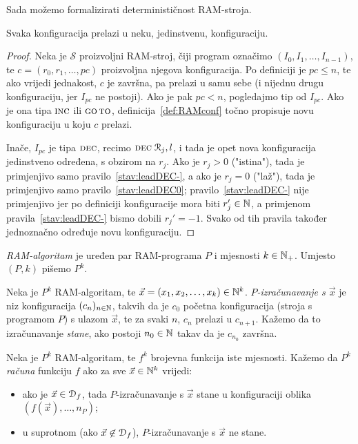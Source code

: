 Sada možemo formalizirati determinističnost RAM-stroja.

\begin{lema}[{name=[determinističnost RAM-stroja]}]\label{lema:ramdet}
Svaka konfiguracija prelazi u neku, jedinstvenu, konfiguraciju.
\end{lema}
\begin{proof}
Neka je $\mathcal S$ proizvoljni RAM-stroj, čiji program označimo  $(I_0, I_1,\dotsc, I_{n-1})$, te $c=(r_0,r_1,\dotsc,pc)$ proizvoljna njegova konfiguracija. Po definiciji je $pc\le n$, te ako vrijedi jednakost, $c$ je završna, pa prelazi u samu sebe (i nijednu drugu konfiguraciju, jer $I_{pc}$ ne postoji). Ako je pak $pc<n$, pogledajmo tip od $I_{pc}$. Ako je ona tipa $\textsc{inc}$ ili $\textsc{go\,to}$, definicija~\ref{def:RAMconf} točno propisuje novu konfiguraciju u koju $c$ prelazi.

    Inače, $I_{pc}$ je tipa $\textsc{dec}$, recimo $\textsc{dec}\;\mathcal R_{j},l$, i tada je opet nova konfiguracija jedinstveno određena, s obzirom na $r_j$. Ako je $r_j>0$ ("istina"), tada je primjenjivo samo pravilo~\ref{stav:leadDEC-}, a ako je $r_j=0$ ("laž"), tada je primjenjivo samo pravilo~\ref{stav:leadDEC0}; pravilo~\ref{stav:leadDEC-} nije primjenjivo jer po definiciji konfiguracije mora biti $r_j'\in{\mathbb N}$, a primjenom pravila~\ref{stav:leadDEC-} bismo dobili $r_j'=-1$. Svako od tih pravila također jednoznačno određuje novu konfiguraciju.
\end{proof}

\begin{definicija}[{name=[{RAM-algoritam, izračunavanje i računanje funkcije}]}]
\label{def:compute}
\emph{RAM-algoritam} je uređen par RAM-programa $P$ i mjesnosti $k\in{\mathbb N}_+$. Umjesto $(P,k)$ pišemo $P^k$.

Neka je $P^k$ RAM-algoritam, te $\vec x=(x_1,x_2,\dotsc,x_k)\in{\mathbb N}^k$. \emph{$P$\!-izračunavanje s $\vec x$} je niz konfiguracija $(c_n)_{n\in{\mathbb N}}$, takvih da je $c_0$ početna konfiguracija (stroja s programom $P$) s ulazom $\vec x$, te za svaki $n$, $c_n$ prelazi u $c_{n+1}$. Kažemo da to izračunavanje \emph{stane}, ako postoji $n_0\in{\mathbb N}$ takav da je $c_{n_0}$ završna.

Neka je $P^k$ RAM-algoritam, te $f^k$ brojevna funkcija iste mjesnosti. Kažemo da $P^k$
\emph{računa} funkciju $f$ ako za sve $\vec x\in{\mathbb N}^k$ vrijedi:
\begin{itemize}
    \item ako  je $\vec x\in \mathcal D_{f}$, tada $P$-izračunavanje s $\vec x$ stane u konfiguraciji oblika $(f(\vec x),\dotsc,n_P)$;
    \item u suprotnom (ako $\vec x\not\in\mathcal D_{f}$), $P$-izračunavanje s $\vec x$ ne stane.\qedhere
\end{itemize}
\end{definicija}

